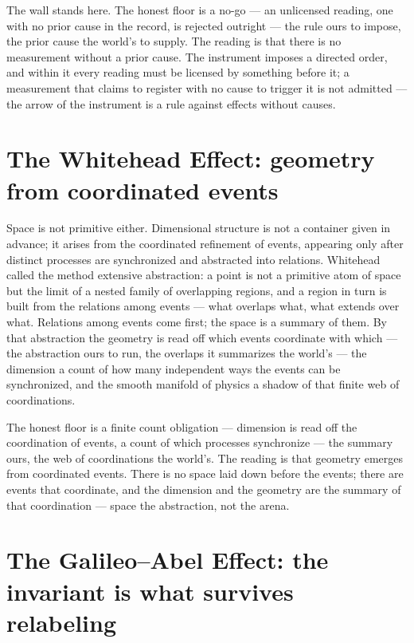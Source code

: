 The wall stands here. The honest floor is a no-go --- an unlicensed reading, one with no prior cause
in the record, is rejected outright --- the rule ours to impose, the prior cause the world's to supply. The
reading is that there is no measurement without a prior cause. The
instrument imposes a directed order, and within it every reading must be licensed by something before it; a
measurement that claims to register with no cause to trigger it is not admitted --- the arrow of the instrument
is a rule against effects without causes.

\section{The Whitehead Effect: geometry from coordinated events}
\label{se:whitehead}

Space is not primitive either. Dimensional structure is not a container given in advance; it arises from the
coordinated refinement of events, appearing only after distinct processes are synchronized and abstracted into
relations. Whitehead called the method extensive abstraction: a point is not a primitive atom of space but the
limit of a nested family of overlapping regions, and a region in turn is built from the relations among events
--- what overlaps what, what extends over what. Relations among events come first; the space is a summary of
them. By that abstraction the geometry is read off which events coordinate with which --- the abstraction ours
to run, the overlaps it summarizes the world's --- the dimension a count of
how many independent ways the events can be synchronized, and the smooth manifold of physics a shadow of that
finite web of coordinations.

The honest floor is a finite count obligation --- dimension is read off the coordination of events, a count of
which processes synchronize --- the summary ours, the web of coordinations the world's. The reading is that
geometry emerges from coordinated events. There is no space
laid down before the events; there are events that coordinate, and the dimension and the geometry are the
summary of that coordination --- space the abstraction, not the arena.

\section{The Galileo--Abel Effect: the invariant is what survives relabeling}
\label{se:galileo-abel}


